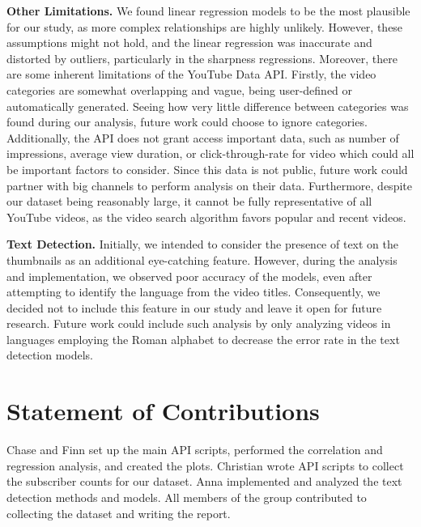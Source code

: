 \documentclass{article}
\begin{document}
\textbf{Other Limitations.} We found linear regression models to be the most plausible for our study, as more complex relationships are highly unlikely. However, these assumptions might not hold, and the linear regression was inaccurate and distorted by outliers, particularly in the sharpness regressions. Moreover, there are some inherent limitations of the YouTube Data API. Firstly, the video categories are somewhat overlapping and vague, being user-defined or automatically generated. Seeing how very little difference between categories was found during our analysis, future work could choose to ignore categories. Additionally, the API does not grant access important data, such as number of impressions, average view duration, or click-through-rate for video which could all be important factors to consider. Since this data is not public, future work could partner with big channels to perform analysis on their data. Furthermore, despite our dataset being reasonably large, it cannot be fully representative of all YouTube videos, as the video search algorithm favors popular and recent videos. 

\textbf{Text Detection.} Initially, we intended to consider the presence of text on the thumbnails as an additional eye-catching feature. However, during the analysis and implementation, we observed poor accuracy of the models, even after attempting to identify the language from the video titles. Consequently, we decided not to include this feature in our study and leave it open for future research. Future work could include such analysis by only analyzing videos in languages employing the Roman alphabet to decrease the error rate in the text detection models.

\section{Statement of Contributions}
Chase and Finn set up the main API scripts, performed the correlation and regression analysis, and created the plots. Christian wrote API scripts to collect the subscriber counts for our dataset. Anna implemented and analyzed the text detection methods and models. All members of the group contributed to collecting the dataset and writing the report.




\end{document}
